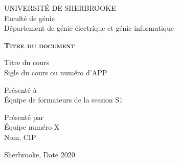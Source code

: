 \begin{titlepage}
    \centering
    UNIVERSITÉ DE SHERBROOKE\\
    Faculté de génie\\
    Département de génie électrique et génie informatique

    \vfill

    {\LARGE \bfseries \scshape Titre du document}

    \vfill

    Titre du cours\\
    Sigle du cours ou numéro d’APP

    \vfill

    Présenté à\\
    Équipe de formateurs de la session S1

    \vfill

    Présenté par\\
    Équipe numéro X\\
    Nom, CIP

    \vfill

    Sherbrooke, Date 2020
\end{titlepage}
